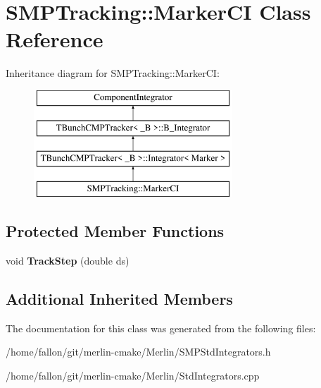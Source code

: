 \hypertarget{classSMPTracking_1_1MarkerCI}{}\section{S\+M\+P\+Tracking\+:\+:Marker\+CI Class Reference}
\label{classSMPTracking_1_1MarkerCI}
Inheritance diagram for S\+M\+P\+Tracking\+:\+:Marker\+CI\+:\begin{figure}[H]
\begin{center}
\leavevmode
\includegraphics[height=4.000000cm]{classSMPTracking_1_1MarkerCI}
\end{center}
\end{figure}
\subsection*{Protected Member Functions}
\begin{DoxyCompactItemize}
\item 
\mbox{\label{classSMPTracking_1_1MarkerCI_a44d302aa47a9004667005aab4302ebda}} 
void {\bfseries Track\+Step} (double ds)
\end{DoxyCompactItemize}
\subsection*{Additional Inherited Members}


The documentation for this class was generated from the following files\+:\begin{DoxyCompactItemize}
\item 
/home/fallon/git/merlin-\/cmake/\+Merlin/S\+M\+P\+Std\+Integrators.\+h\item 
/home/fallon/git/merlin-\/cmake/\+Merlin/Std\+Integrators.\+cpp\end{DoxyCompactItemize}
